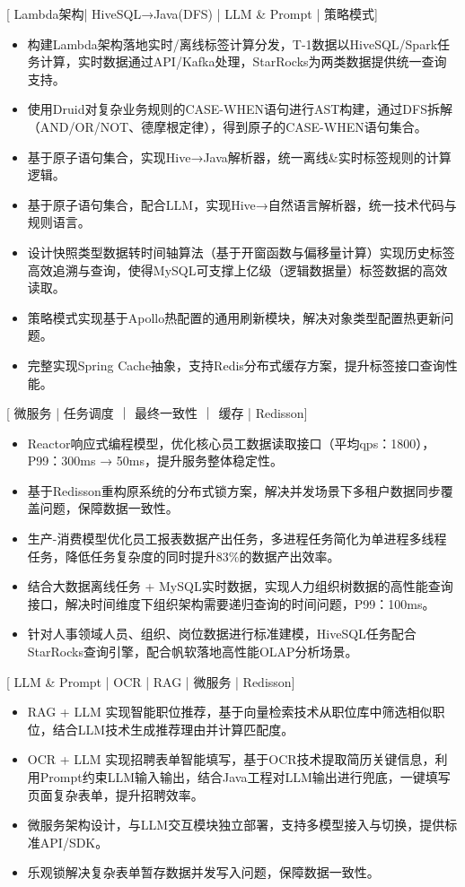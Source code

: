 \documentclass{resume}
\begin{document}
[ \textnormal{Lambda架构| HiveSQL→Java(DFS) | LLM \& Prompt | 策略模式}]
\begin{itemize}
  \item 构建Lambda架构落地实时/离线标签计算分发，T-1数据以HiveSQL/Spark任务计算，实时数据通过API/Kafka处理，StarRocks为两类数据提供统一查询支持。
  \item 使用Druid对复杂业务规则的CASE-WHEN语句进行AST构建，通过DFS拆解（AND/OR/NOT、德摩根定律），得到原子的CASE-WHEN语句集合。
  \item 基于原子语句集合，实现Hive→Java解析器，统一离线\&实时标签规则的计算逻辑。
  \item 基于原子语句集合，配合LLM，实现Hive→自然语言解析器，统一技术代码与规则语言。
  \item 设计快照类型数据转时间轴算法（基于开窗函数与偏移量计算）实现历史标签高效追溯与查询，使得MySQL可支撑上亿级（逻辑数据量）标签数据的高效读取。
  \item 策略模式实现基于Apollo热配置的通用刷新模块，解决对象类型配置热更新问题。
  \item 完整实现Spring Cache抽象，支持Redis分布式缓存方案，提升标签接口查询性能。
\end{itemize}

[ \textnormal{微服务 | 任务调度 ｜ 最终一致性 ｜ 缓存 | Redisson}]
\begin{itemize}
  \item Reactor响应式编程模型，优化核心员工数据读取接口（平均qps：1800），P99：300ms → 50ms，提升服务整体稳定性。
  \item 基于Redisson重构原系统的分布式锁方案，解决并发场景下多租户数据同步覆盖问题，保障数据一致性。
  \item 生产-消费模型优化员工报表数据产出任务，多进程任务简化为单进程多线程任务，降低任务复杂度的同时提升83\%的数据产出效率。
  \item 结合大数据离线任务 + MySQL实时数据，实现人力组织树数据的高性能查询接口，解决时间维度下组织架构需要递归查询的时间问题，P99：100ms。
  \item 针对人事领域人员、组织、岗位数据进行标准建模，HiveSQL任务配合StarRocks查询引擎，配合帆软落地高性能OLAP分析场景。
\end{itemize}

[ \textnormal{LLM \& Prompt | OCR | RAG | 微服务 | Redisson}]
\begin{itemize}
  \item RAG + LLM 实现智能职位推荐，基于向量检索技术从职位库中筛选相似职位，结合LLM技术生成推荐理由并计算匹配度。
  \item OCR + LLM 实现招聘表单智能填写，基于OCR技术提取简历关键信息，利用Prompt约束LLM输入输出，结合Java工程对LLM输出进行兜底，一键填写页面复杂表单，提升招聘效率。
  \item 微服务架构设计，与LLM交互模块独立部署，支持多模型接入与切换，提供标准API/SDK。
  \item 乐观锁解决复杂表单暂存数据并发写入问题，保障数据一致性。
\end{itemize}
\end{document}
